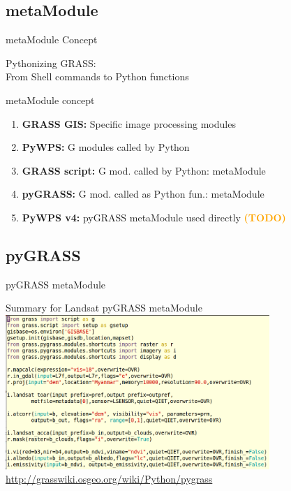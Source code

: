 \documentclass[xcolor=dvipsnames,beamer]{beamer} %
\begin{document}
\subsection{metaModule}
\begin{frame}[fragile]{metaModule Concept}

Pythonizing GRASS:\\ From Shell commands to Python functions 

\begin{block}{metaModule concept}
\begin{enumerate}
 \item {\bf GRASS GIS:} Specific image processing modules
 \item {\bf PyWPS:} G modules called by Python
 \item {\bf GRASS script:} G mod. called by Python: metaModule
 \item {\bf pyGRASS:} G mod. called as Python fun.: metaModule
 \item {\bf PyWPS v4:} pyGRASS metaModule used directly \textcolor{orange}{\bf{(TODO)}}
\end{enumerate}

\end{block}

\end{frame}

\subsection{pyGRASS}
\begin{frame}[fragile]{pyGRASS metaModule}

\begin{center}
 Summary for Landsat pyGRASS metaModule
 \includegraphics[width=10cm]{pyGRASS1}\\
 \href{http://grasswiki.osgeo.org/wiki/Python/pygrass}{http://grasswiki.osgeo.org/wiki/Python/pygrass}
\end{center}

\end{frame}
\end{document}
